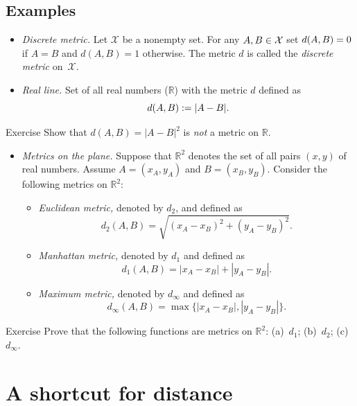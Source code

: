 \pagebreak

\subsection*{Examples}

\begin{itemize}
\item {}\emph{Discrete metric.} Let $\mathcal X$ be a nonempty set.
For any $A,B\z\in\mathcal X$ set $d(A,B)\z=0$ if $A=B$ and $d(A,B)=1$ otherwise.
The metric $d$ is called the \emph{discrete metric} on~$\mathcal X$.
\item{}\emph{Real line.}
Set of all real numbers ($\mathbb{R}$) with the metric $d$ defined as 
$$d(A,B):=|A-B|.$$
\end{itemize}

\begin{thm}{Exercise}\label{ex:dist-square}
Show that $d(A,B)=|A-B|^2$ is \textit{not} a metric on $\mathbb{R}$.
\end{thm}

\begin{itemize}
\item \textit{Metrics on the plane.}
Suppose that $\mathbb{R}^2$ denotes the set of all pairs $(x,y)$ of real numbers.
Assume $A=(x_A,y_A)$ and $B=(x_B,y_B)$.
Consider the following metrics on $\mathbb{R}^2$:
\begin{itemize}
\item{}\emph{Euclidean metric,} denoted by $d_2$, and defined as \label{def:d_2}
$$d_2(A,B)=\sqrt{(x_A-x_B)^2+(y_A-y_B)^2}.$$
\item\label{Manhattan plane}\emph{Manhattan metric,} denoted by $d_1$ and defined as 
$$d_1(A,B)=|x_A-x_B|+|y_A-y_B|.$$
\item{}\emph{Maximum metric,} denoted by $d_\infty$ and defined as 
$$d_\infty(A,B)=\max\{|x_A-x_B|,|y_A-y_B|\}.$$
\end{itemize}
\end{itemize}

\begin{thm}{Exercise}\label{ex:d_1+d_2+d_infty}
Prove that the following functions are metrics on $\mathbb{R}^2$:
(a)~$d_1$; (b)~$d_2$; (c)~$d_\infty$.
\end{thm}


\section{A shortcut for distance}

